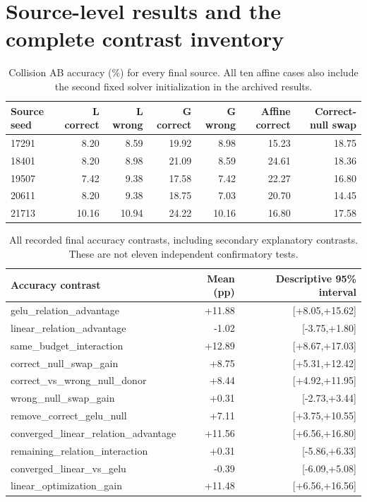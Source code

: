 \section{Source-level results and the complete contrast inventory}
\begin{table}[ht]\centering\small
\begin{tabular}{lrrrrrr}\toprule
Source seed & L correct & L wrong & G correct & G wrong & Affine correct & Correct-null swap\\\midrule
17291 & 8.20 & 8.59 & 19.92 & 8.98 & 15.23 & 18.75 \\
18401 & 8.20 & 8.98 & 21.09 & 8.59 & 24.61 & 18.36 \\
19507 & 7.42 & 9.38 & 17.58 & 7.42 & 22.27 & 16.80 \\
20611 & 8.20 & 9.38 & 18.75 & 7.03 & 20.70 & 14.45 \\
21713 & 10.16 & 10.94 & 24.22 & 10.16 & 16.80 & 17.58 \\
\bottomrule\end{tabular}
\caption{Collision AB accuracy (\%) for every final source. All ten affine cases also include the second fixed solver initialization in the archived results.}
\end{table}
\begin{table}[ht]\centering\small
\begin{tabular}{lrr}\toprule
Accuracy contrast & Mean (pp) & Descriptive 95\% interval\\\midrule
gelu\_relation\_advantage & +11.88 & [+8.05,+15.62] \\
linear\_relation\_advantage & -1.02 & [-3.75,+1.80] \\
same\_budget\_interaction & +12.89 & [+8.67,+17.03] \\
correct\_null\_swap\_gain & +8.75 & [+5.31,+12.42] \\
correct\_vs\_wrong\_null\_donor & +8.44 & [+4.92,+11.95] \\
wrong\_null\_swap\_gain & +0.31 & [-2.73,+3.44] \\
remove\_correct\_gelu\_null & +7.11 & [+3.75,+10.55] \\
converged\_linear\_relation\_advantage & +11.56 & [+6.56,+16.80] \\
remaining\_relation\_interaction & +0.31 & [-5.86,+6.33] \\
converged\_linear\_vs\_gelu & -0.39 & [-6.09,+5.08] \\
linear\_optimization\_gain & +11.48 & [+6.56,+16.56] \\
\bottomrule\end{tabular}
\caption{All recorded final accuracy contrasts, including secondary explanatory contrasts. These are not eleven independent confirmatory tests.}
\end{table}
